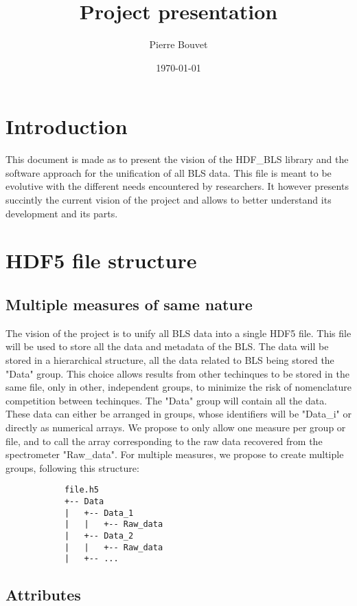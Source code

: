 \documentclass{article}
\title{Project presentation}
\author{Pierre Bouvet}
\date{\today}
\begin{document}
\maketitle


\section{Introduction}
This document is made as to present the vision of the HDF\_BLS library and the software approach for the unification of all BLS data. This file is meant to be evolutive with the different needs encountered by researchers. It however presents succintly the current vision of the project and allows to better understand its development and its parts.

\section{HDF5 file structure}

    \subsection{Multiple measures of same nature}
        The vision of the project is to unify all BLS data into a single HDF5 file. This file will be used to store all the data and metadata of the BLS. The data will be stored in a hierarchical structure, all the data related to BLS being stored the "Data" group. This choice allows results from other techinques to be stored in the same file, only in other, independent groups, to minimize the risk of nomenclature competition between techinques. The "Data" group will contain all the data. These data can either be arranged in groups, whose identifiers will be "Data\_i" or directly as numerical arrays. We propose to only allow one measure per group or file, and to call the array corresponding to the raw data recovered from the spectrometer "Raw\_data". For multiple measures, we propose to create multiple groups, following this structure:

        \begin{verbatim}
            file.h5
            +-- Data
            |   +-- Data_1
            |   |   +-- Raw_data
            |   +-- Data_2
            |   |   +-- Raw_data
            |   +-- ...
        \end{verbatim}

    \subsection{Attributes}
\end{document}
